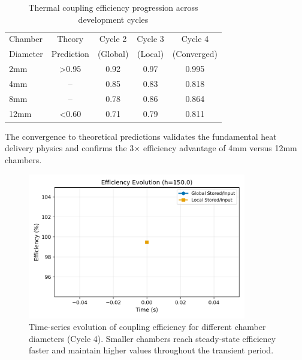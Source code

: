 \begin{table}[H]
\centering
\caption{Thermal coupling efficiency progression across development cycles}
\begin{tabular}{@{}lcccc@{}}
\toprule
Chamber & Theory & Cycle 2 & Cycle 3 & Cycle 4 \\
Diameter & Prediction & (Global) & (Local) & (Converged) \\
\midrule
2mm & >0.95 & 0.92 & 0.97 & 0.995 \\
4mm & -- & 0.85 & 0.83 & 0.818 \\
8mm & -- & 0.78 & 0.86 & 0.864 \\
12mm & <0.60 & 0.71 & 0.79 & 0.811 \\
\bottomrule
\end{tabular}
\end{table}

The convergence to theoretical predictions validates the fundamental heat delivery physics and confirms the 3× efficiency advantage of 4mm versus 12mm chambers.

\begin{figure}[H]
    \centering
    \includegraphics[width=0.85\textwidth]{figures/simulations/coupling_timeseries_h150.0_DEV_CYCLE_4.png}
    \caption{Time-series evolution of coupling efficiency for different chamber diameters (Cycle 4). Smaller chambers reach steady-state efficiency faster and maintain higher values throughout the transient period.}
    \label{fig:coupling_timeseries}
\end{figure}

